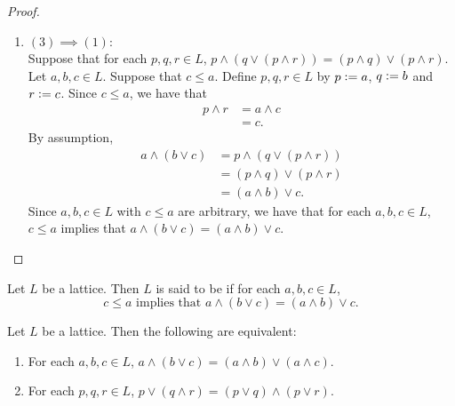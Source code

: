 \documentclass{book}
\begin{document}
\begin{proof}
\begin{enumerate}
			\item $(3) \implies (1)$: \\
			Suppose that for each $p,q,r \in L$, $p \wedge (q \vee (p \wedge r)) = (p \wedge q) \vee (p \wedge r)$. Let $a,b,c \in L$. Suppose that $c \leq a$. Define $p,q,r \in L$ by $p \vcentcolon= a$, $q \vcentcolon= b$ and $r \vcentcolon= c$. Since $c \leq a$, we have that 
			\begin{align*}
				p \wedge r
				& = a \wedge c \\
				& = c.
			\end{align*}
			By assumption, 
			\begin{align*}
				a \wedge (b \vee c)
				& = p \wedge (q \vee (p \wedge r)) \\
				& = (p \wedge q) \vee (p \wedge r) \\
				& = (a \wedge b) \vee c.
			\end{align*}
			Since $a,b,c \in L$ with $c \leq a$ are arbitrary, we have that for each $a,b,c \in L$, $c \leq a$ implies that $a \wedge (b \vee c) = (a \wedge b) \vee c$.
		\end{enumerate}
	\end{proof}
	
	\begin{defn}
		Let $L$ be a lattice. Then $L$ is said to be  if for each $a,b,c \in L$, 
		$$\text{$c \leq a$ implies that $a \wedge (b \vee c) = (a \wedge b) \vee c$.}$$
	\end{defn}
	
	\begin{ex}
		Let $L$ be a lattice. Then the following are equivalent:
		\begin{enumerate}
			\item For each $a,b,c \in L$, $a \wedge (b \vee c) = (a \wedge b) \vee (a \wedge c)$.
			\item For each $p,q,r \in L$, $p \vee (q \wedge r) = (p \vee q) \wedge (p \vee r)$.
		\end{enumerate}
	\end{ex}
	
\end{document}
